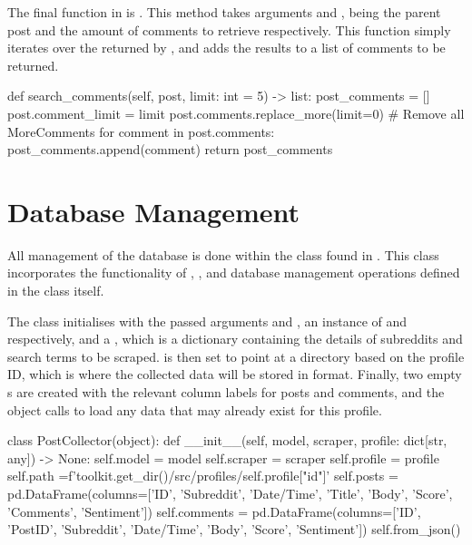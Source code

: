The final function in  is . This method takes arguments  and , being the parent post and the amount of comments to retrieve respectively. This function simply iterates over the  returned by , and adds the results to a list of comments to be returned.

\begin{python}
def search_comments(self, post, limit: int = 5) -> list:
post_comments = []
    post.comment_limit = limit
    post.comments.replace_more(limit=0) # Remove all MoreComments
    for comment in post.comments:
        post_comments.append(comment)
    return post_comments
\end{python}

\section{Database Management}
All management of the database is done within the  class found in . This class incorporates the functionality of , , and database management operations defined in the class itself.

The class initialises with the passed arguments  and , an instance of  and  respectively, and a , which is a dictionary containing the details of subreddits and search terms to be scraped.  is then set to point at a directory based on the profile ID, which is where the collected data will be stored in  format. Finally, two empty s are created with the relevant column labels for posts and comments, and the object calls  to load any data that may already exist for this profile.

\begin{python}
class PostCollector(object):
    def __init__(self, model, scraper, profile: dict[str, any]) -> None:
        self.model = model
        self.scraper = scraper
        self.profile = profile
        self.path =f'{toolkit.get_dir()}/src/profiles/{self.profile["id"]}'
        self.posts = pd.DataFrame(columns=['ID', 'Subreddit', 'Date/Time', 'Title', 'Body', 'Score', 'Comments', 'Sentiment'])
        self.comments = pd.DataFrame(columns=['ID', 'PostID', 'Subreddit', 'Date/Time', 'Body', 'Score', 'Sentiment'])
        self.from_json()
\end{python}

